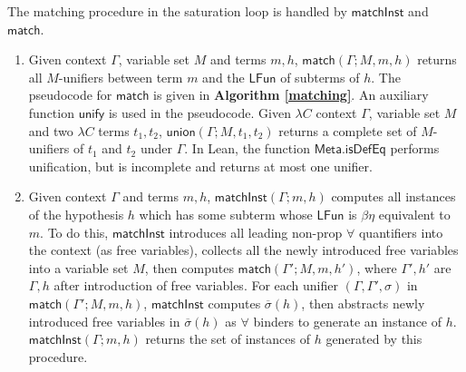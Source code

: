 The matching procedure in the saturation loop is handled by $\mathsf{matchInst}$ and $\mathsf{match}$.
\begin{enumerate}
  \item Given context $\Gamma$, variable set $M$ and terms $m, h$,
    $\mathsf{match}(\Gamma; M, m, h)$ returns all $M$-unifiers between term $m$ and the $\mathsf{LFun}$ of subterms of $h$.
    The pseudocode for $\mathsf{match}$ is given in \textbf{Algorithm \ref{matching}}. An auxiliary function
    $\mathsf{unify}$ is used in the pseudocode. Given $\lambda C$ context $\Gamma$, variable set $M$
    and two $\lambda C$ terms $t_1, t_2$, $\mathsf{union}(\Gamma; M, t_1, t_2)$ returns a complete set of
    $M$-unifiers of $t_1$ and $t_2$ under $\Gamma$. In Lean, the function $\mathsf{Meta.isDefEq}$ performs
    unification, but is incomplete and returns at most one unifier.
  \item Given context $\Gamma$ and terms $m, h$,
    $\mathsf{matchInst}(\Gamma; m, h)$ computes all instances of the hypothesis $h$ which has some subterm whose
    $\mathsf{LFun}$ is $\beta\eta$ equivalent to $m$. To do this, $\mathsf{matchInst}$ introduces all leading non-prop $\forall$
    quantifiers into the context (as free variables), collects all the newly introduced free variables into a variable set $M$,
    then computes $\mathsf{match}(\Gamma'; M, m, h')$, where $\Gamma', h'$ are $\Gamma, h$ after introduction of free variables.
    For each unifier $(\Gamma, \Gamma', \sigma)$ in $\mathsf{match}(\Gamma'; M, m, h)$, $\mathsf{matchInst}$ computes $\overline{\sigma}(h)$,
    then abstracts newly introduced free variables in $\overline{\sigma}(h)$ as $\forall$ binders to generate an instance of $h$.
    $\mathsf{matchInst}(\Gamma; m, h)$ returns the set of instances of $h$ generated by this procedure. 
\end{enumerate}

